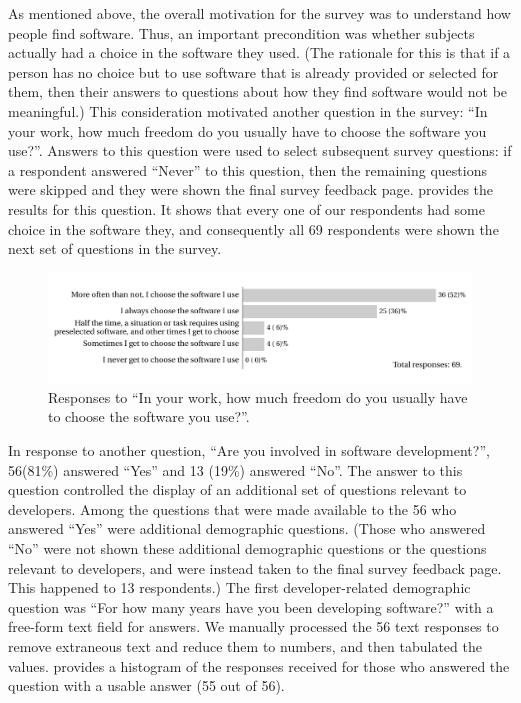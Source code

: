 \documentclass{casicswhitepaper}
\newcommand{\totalrespondents}{69\xspace}
\newcommand{\totaldevelopers}{56\xspace}
\begin{document}
As mentioned above, the overall motivation for the survey was to understand how people find software.  Thus, an important precondition was whether subjects actually had a choice in the software they used.  (The rationale for this is that if a person has no choice but to use software that is already provided or selected for them, then their answers to questions about how they find software would not be meaningful.)  This consideration motivated another question in the survey: ``In your work, how much freedom do you usually have to choose the software you use?''.   Answers to this question were used to select subsequent survey questions: if a respondent answered ``Never'' to this question, then the remaining questions were skipped and they were shown the final survey feedback page.   provides the results for this question.  It shows that every one of our respondents had some choice in the software they, and consequently all \totalrespondents respondents were shown the next set of questions in the survey.  %

\begin{figure}[htb]
  \vspace*{-1ex}
  \centering
  \includegraphics[width=6in]{files/plots/how-often-choose-software.pdf}
  \vspace*{-7ex}
  \caption{Responses to ``In your work, how much freedom do you usually have to choose the software you use?''.}
  \label{freedom}
\end{figure}

In response to another question, ``Are you involved in software development?'', \totaldevelopers (81\%) answered ``Yes'' and 13 (19\%) answered ``No''.  The answer to this question controlled the display of an additional set of questions relevant to developers.  Among the questions that were made available to the \totaldevelopers who answered ``Yes'' were additional demographic questions.  (Those who answered ``No'' were not shown these additional demographic questions or the questions relevant to developers, and were instead taken to the final survey feedback page.  This happened to 13 respondents.)  The first developer-related demographic question was ``For how many years have you been developing software?'' with a free-form text field for answers.  We manually processed the \totaldevelopers text responses to remove extraneous text and reduce them to numbers, and then tabulated the values.   provides a histogram of the responses received for those who answered the question with a usable answer (55 out of \totaldevelopers).
\end{document}
